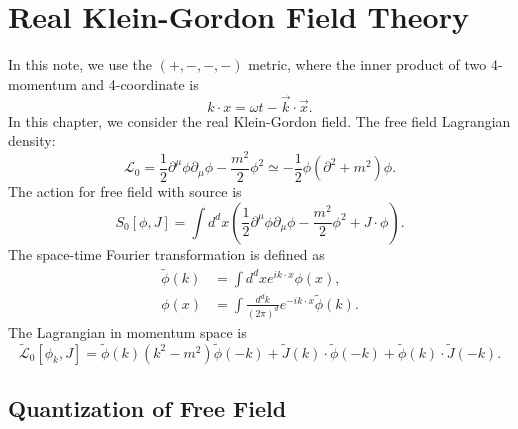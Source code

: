 \chapter{Real Klein-Gordon Field Theory}
In this note, we use the $(+,-,-,-)$ metric, where the inner product of two 4-momentum and 4-coordinate is
\begin{equation}
	k\cdot x=\omega t-\vec k\cdot \vec x.
\end{equation}
In this chapter, we consider the real Klein-Gordon field.
The free field Lagrangian density:
\begin{equation}
	\mathcal L_0 = \frac{1}{2}\partial^\mu \phi \partial_\mu \phi -\frac{m^2}{2}\phi^2 
	\simeq -\frac{1}{2}\phi (\partial^2+m^2) \phi.
\end{equation}
The action for free field with source is
\begin{equation}
	S_0[\phi,J]
	= \int d^dx\left(\frac{1}{2}\partial^\mu \phi \partial_\mu \phi -\frac{m^2}{2}\phi^2 + J\cdot\phi\right).
\end{equation}
The space-time Fourier transformation is defined as
\begin{equation}
\begin{aligned}
	\tilde{\phi}(k) &= \int d^{d}x e^{ik\cdot x} \phi(x), \\ 
	\phi(x) &= \int \frac{d^{d}k}{(2\pi)^{d}} e^{-ik\cdot x}\tilde{\phi}(k).
\end{aligned}
\end{equation}
The Lagrangian in momentum space is
\begin{equation*}
	\tilde{\mathcal L}_0[\phi_k,J]=\tilde\phi(k)( k^2-m^2)\tilde\phi(-k)+\tilde J(k)\cdot\tilde\phi(-k)+\tilde\phi(k)\cdot\tilde J(-k).
\end{equation*}





\section{Quantization of Free Field}



